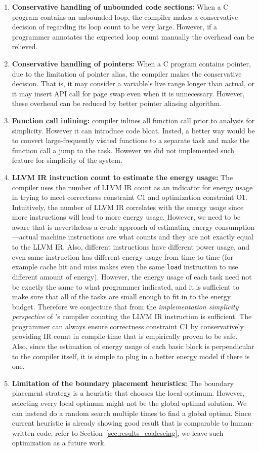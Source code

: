 \begin{enumerate}
	\item \textbf{Conservative handling of unbounded code sections:} When a C program contains an unbounded loop, the \sys compiler makes a conservative decision of regarding its loop count to be very large. However, if a programmer annotates the expected loop count manually the overhead can be relieved.
	\item \textbf{Conservative handling of pointers:} When a C program contains pointer, due to the limitation of pointer alias, the compiler makes the conservative decision. That is, it may consider a variable's live range longer than actual, or it may insert API call for page swap even when it is unnecessary. However, these overhead can be reduced by better pointer aliasing algorithm.
	\item \textbf{Function call inlining:} \sys compiler inlines all function call prior to analysis for simplicity. However it can introduce code bloat. Insted, a better way would be to convert large-frequently visited functions to a separate task and make the function call a jump to the task. However we did not implemented such feature for simplicity of the system.
	\item \textbf{LLVM IR instruction count to estimate the energy usage:} The compiler uses the number of LLVM IR count as an indicator for energy usage in trying to meet correctness constraint C1 and optimization constraint O1. Intuitively, the number of LLVM IR correlates with the energy usage since more instructions will lead to more energy usage. However, we need to be aware that is nevertheless a crude approach of estimating energy consumption---actual machine instructions are what counts and they are not exactly equal to the LLVM IR. Also, different instructions have different power usage, and even same instruction has different energy usage from time to time (for example cache hit and miss makes even the same {\tt load} instruction to use different amount of energy). However, the energy usage of each task need not be exactly the same to what programmer indicated, and it is sufficient to make sure that all of the tasks are small enough to fit in to the energy budget. Therefore we conjecture that from the \emph{implementation simplicity perspective} of \sys's compiler counting the LLVM IR instruction is sufficient. The programmer can always ensure correctness constraint C1 by conservatively providing IR count in compile time that is empirically proven to be safe. Also, since the estimation of energy usage of each basic block is perpendicular to the compiler itself, it is simple to plug in a better energy model if there is one.
	\item \textbf{Limitation of the boundary placement heuristics:} The boundary placement strategy is a heuristic that chooses the local optimum. However, selecting every local optimum might not be the global optimal solution. We can instead do a random search multiple times to find a global optima. Since current heuristic is already showing good result that is comparable to human-written code, refer to Section~\ref{sec:results_coalescing}, we leave such optimization as a future work.
\end{enumerate}
